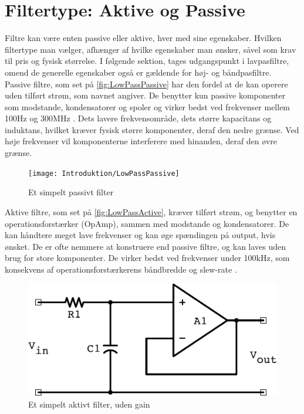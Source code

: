 \section{Filtertype: Aktive og Passive}
\label{Filtertype}
Filtre kan være enten passive eller aktive, hver med sine egenskaber. Hvilken filtertype man vælger, afhænger af hvilke egenskaber man ønsker, såvel som krav til pris og fysisk størrelse. I følgende sektion, tages udgangspunkt i lavpasfiltre, omend de generelle egenskaber også er gældende for høj- og båndpasfiltre.\\
Passive filtre, som set på \autoref{fig:LowPassPassive} har den fordel at de kan operere uden tilført strøm, som navnet angiver. De benytter kun passive komponenter som modstande, kondensatorer og spoler og virker bedst ved frekvenser mellem 100Hz og 300MHz \parencite{BOOK:PracticalElectronicsforInventors}. Dets lavere frekvensområde, dets større kapacitans og induktans, hvilket kræver fysisk større komponenter, deraf den nedre grænse. Ved høje frekvenser vil komponenterne interferere med hinanden, deraf den øvre grænse.
%
\begin{figure}[H]
	\centering
	\texttt{[image: Introduktion/LowPassPassive]}
	\caption{Et simpelt passivt filter}
	\label{fig:LowPassPassive}
\end{figure}
\noindent
%
Aktive filtre, som set på \autoref{fig:LowPassActive}, kræver tilført strøm, og benytter en operationsforstærker (OpAmp), sammen med modstande og kondensatorer. De kan håndtere meget lave frekvenser og kan øge spændingen på output, hvis ønsket. De er ofte nemmere at konstruere end passive filtre, og kan laves uden brug for store komponenter. De virker bedst ved frekvenser under 100kHz, som konsekvens af operationsforstærkerens båndbredde og slew-rate \parencite{BOOK:PracticalElectronicsforInventors} .
%
\begin{figure}[H]
	\centering
	\includegraphics[resolution=300,scale=\diagramSize]{Figure/Introduktion/ActiveLowPass.pdf}
	\caption{Et simpelt aktivt filter, uden gain}
	\label{fig:LowPassActive}
\end{figure}
